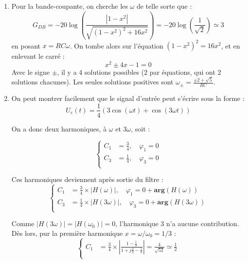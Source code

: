 \begin{correction}
\begin{enumerate}
	\item Pour la bande-coupante, on cherche les $\omega$ de telle sorte que :
\begin{equation}
	G_{DB} = -20\log \left( \frac{|1-x^2|}{\sqrt{(1-x^2)^2+16x^2}}\right) = -20\log\left(\frac{1}{\sqrt{2}} \right) \simeq 3
\end{equation}	
	en posant $x=RC\omega$.
On tombe alors sur l'équation $(1-x^2)^2=16x^2$, et en enlevant le carré :
\begin{equation}
	x^2\pm 4x -1 =0
\end{equation}
Avec le signe $\pm$, il y a 4 solutions possibles (2 par équations, qui ont 2 solutions chacunes). Les seules solutions positives sont $\omega_{\pm}=\frac{\pm 2+\sqrt{5}}{RC}$.

	\item On peut montrer facilement que le signal d'entrée peut s'écrire sous la forme :
	\begin{equation}
		U_e(t)=\frac{1}{4}\left( 3\cos(\omega t) + \cos(3\omega t)\right) 
	\end{equation}
	
	On a donc deux harmoniques, à $\omega$ et $3\omega$, soit :

\begin{equation}
	\left\lbrace
	\begin{array}{lll}
		C_1 & = \frac{3}{4}, \quad \varphi_1=0 \\

		C_3 & = \frac{1}{4}, \quad \varphi_3=0  \\
	\end{array}\right.
\end{equation}	

Ces harmoniques deviennent après sortie du filtre : 
\begin{equation}
	\left\lbrace
	\begin{array}{lll}
		C_1 & = \frac{3}{4}\times |H(\omega)|, \quad \varphi_1=0 + \mathbf{arg}\left(H(\omega) \right)  \\

		C_3 & = \frac{1}{4}\times |H(3\omega)|, \quad \varphi_3=0 + \mathbf{arg}\left(H(3\omega) \right)  \\
	\end{array}\right.
\end{equation}		

Comme $|H(3\omega)| = |H(\omega_0)| = 0$, l'harmonique 3 n'a aucune contribution. Dès lors, pur la première harmonique $x=\omega/\omega_0=1/3$ : 
\begin{equation}
	\left\lbrace
	\begin{array}{lll}
		C_1 & = \frac{3}{4}\times \left|\frac{1-\frac{1}{9}}{1+j\frac{4}{3}-\frac{1}{9}} \right| =\frac{4}{\sqrt{52}} \simeq\frac{1}{2} \\


\end{array}
\end{equation}
\end{enumerate}
\end{correction}
